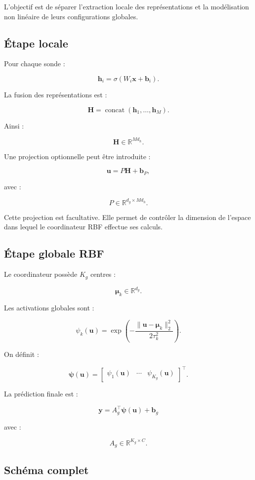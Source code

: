 \documentclass[11pt,a4paper]{article}
\begin{document}
L'objectif est de séparer l'extraction locale des représentations
et la modélisation non linéaire de leurs configurations globales.

\subsection{Étape locale}

Pour chaque sonde :

\[
  \bm{h}_i
  =
  \sigma(W_i\bm{x}+\bm{b}_i).
\]

La fusion des représentations est :

\[
  \bm{H}
  =
  \operatorname{concat}
  (\bm{h}_1,\ldots,\bm{h}_M).
\]

Ainsi :

\[
  \bm{H}\in\mathbb{R}^{Md_h}.
\]

Une projection optionnelle peut être introduite :

\[
  \bm{u}=P\bm{H}+\bm{b}_P,
\]

avec :

\[
  P\in\mathbb{R}^{d_g\times Md_h}.
\]

Cette projection est facultative. Elle permet de contrôler
la dimension de l'espace dans lequel le coordinateur RBF
effectue ses calculs.

\subsection{Étape globale RBF}

Le coordinateur possède \(K_g\) centres :

\[
  \bm{\mu}_k\in\mathbb{R}^{d_g}.
\]

Les activations globales sont :

\[
  \psi_k(\bm{u})
  =
  \exp\left(
    -\frac{
      \|\bm{u}-\bm{\mu}_k\|_2^2
    }{
      2\tau_k^2
    }
  \right).
\]

On définit :

\[
  \bm{\psi}(\bm{u})
  =
  \begin{bmatrix}
  \psi_1(\bm{u})&
  \cdots&
  \psi_{K_g}(\bm{u})
  \end{bmatrix}^{\top}.
\]

La prédiction finale est :

\[
  \boxed{
  \bm{y}
  =
  A_g^\top\bm{\psi}(\bm{u})
  +\bm{b}_g
  }
\]

avec :

\[
  A_g\in\mathbb{R}^{K_g\times C}.
\]

\subsection{Schéma complet}
\end{document}
